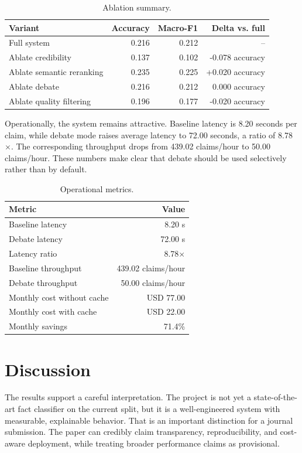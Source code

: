 \documentclass[11pt,a4paper]{article}
\begin{document}
\begin{table}[htbp]
\centering
\caption{Ablation summary.}
\label{tab:ablation}
\begin{tabular}{lrrr}
\toprule
Variant & Accuracy & Macro-F1 & Delta vs. full \\
\midrule
Full system & 0.216 & 0.212 & -- \\
Ablate credibility & 0.137 & 0.102 & -0.078 accuracy \\
Ablate semantic reranking & 0.235 & 0.225 & +0.020 accuracy \\
Ablate debate & 0.216 & 0.212 & 0.000 accuracy \\
Ablate quality filtering & 0.196 & 0.177 & -0.020 accuracy \\
\bottomrule
\end{tabular}
\end{table}

Operationally, the system remains attractive. Baseline latency is 8.20 seconds per claim, while debate mode raises average latency to 72.00 seconds, a ratio of 8.78\,$\times$. The corresponding throughput drops from 439.02 claims/hour to 50.00 claims/hour. These numbers make clear that debate should be used selectively rather than by default.

\begin{table}[htbp]
\centering
\caption{Operational metrics.}
\label{tab:ops}
\begin{tabular}{lr}
\toprule
Metric & Value \\
\midrule
Baseline latency & 8.20 s \\
Debate latency & 72.00 s \\
Latency ratio & 8.78$\times$ \\
Baseline throughput & 439.02 claims/hour \\
Debate throughput & 50.00 claims/hour \\
Monthly cost without cache & USD 77.00 \\
Monthly cost with cache & USD 22.00 \\
Monthly savings & 71.4\% \\
\bottomrule
\end{tabular}
\end{table}

\section{Discussion}

The results support a careful interpretation. The project is not yet a state-of-the-art fact classifier on the current split, but it is a well-engineered system with measurable, explainable behavior. That is an important distinction for a journal submission. The paper can credibly claim transparency, reproducibility, and cost-aware deployment, while treating broader performance claims as provisional.
\end{document}
